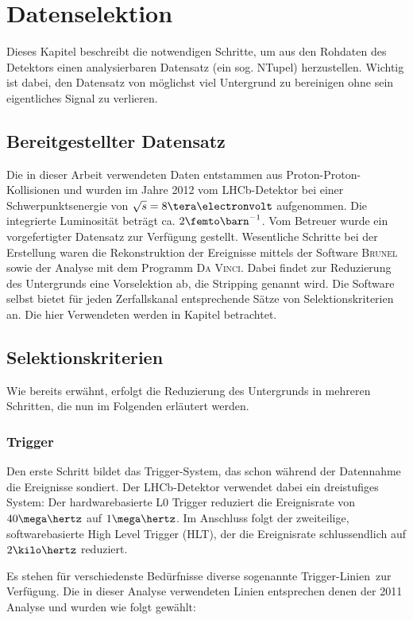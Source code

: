 \chapter{Datenselektion} \label{kap:datenselektion}
Dieses Kapitel beschreibt die notwendigen Schritte, um aus den Rohdaten des Detektors einen analysierbaren Datensatz (ein sog. NTupel) herzustellen. Wichtig ist dabei, den Datensatz von möglichst viel Untergrund zu bereinigen ohne sein eigentliches Signal zu verlieren.

\section{Bereitgestellter Datensatz}
Die in dieser Arbeit verwendeten Daten entstammen aus Proton-Proton-Kollisionen und wurden im Jahre 2012 vom LHCb-Detektor bei einer Schwerpunktsenergie von $\sqrt{s} = 8\tera\electronvolt$ aufgenommen. Die integrierte Luminosität beträgt ca. $2\femto\barn^{-1}$. Vom Betreuer wurde ein vorgefertigter Datensatz zur Verfügung gestellt. Wesentliche Schritte bei der Erstellung waren die Rekonstruktion der Ereignisse mittels der Software \textsc{Brunel} sowie der Analyse mit dem Programm \textsc{Da Vinci}. Dabei findet zur Reduzierung des Untergrunds eine Vorselektion ab, die Stripping genannt wird. Die Software selbst bietet für jeden Zerfallskanal entsprechende Sätze von Selektionskriterien an. Die hier Verwendeten werden in Kapitel \label{kap:stripping} betrachtet.


\section{Selektionskriterien}
Wie bereits erwähnt, erfolgt die Reduzierung des Untergrunds in mehreren Schritten, die nun im Folgenden erläutert werden.

\subsection{Trigger} \label{kap:trigger}
Den erste Schritt bildet das Trigger-System, das schon während der Datennahme die Ereignisse sondiert. Der LHCb-Detektor verwendet dabei ein dreistufiges System: Der hardwarebasierte \glqq L0 Trigger \grqq reduziert die Ereignisrate von $40\mega\hertz$ auf $1\mega\hertz$. Im Anschluss folgt der zweiteilige, softwarebasierte \glqq High Level Trigger \grqq (HLT), der die Ereignisrate schlussendlich auf $2\kilo\hertz$ reduziert.\cite{trigger} 

Es stehen für verschiedenste Bedürfnisse diverse sogenannte \glqq Trigger-Linien\grqq\ zur Verfügung. Die in dieser Analyse verwendeten Linien entsprechen denen der 2011 Analyse \cite{lhcb-paper} und wurden wie folgt gewählt:

